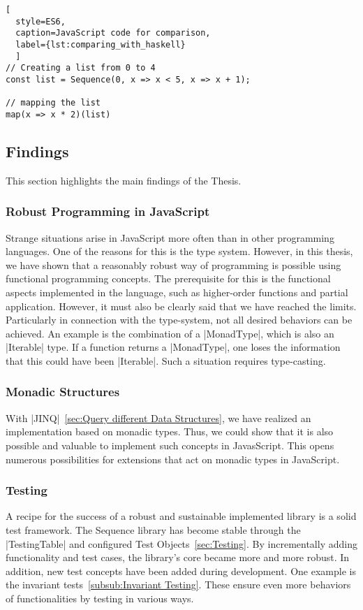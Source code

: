 \begin{lstlisting}[
  style=ES6, 
  caption=JavaScript code for comparison,
  label={lst:comparing_with_haskell}
  ]
// Creating a list from 0 to 4
const list = Sequence(0, x => x < 5, x => x + 1);

// mapping the list
map(x => x * 2)(list)
\end{lstlisting}

\subsection{Findings}
\label{sub:Findings}
This section highlights the main findings of the Thesis.

\subsubsection{Robust Programming in JavaScript}
\label{subsub:Robust Programming in JavaScript}
Strange situations arise in JavaScript more often than in other programming
languages. One of the reasons for this is the type system. However, in this
thesis, we have shown that a reasonably robust way of programming is possible
using functional programming concepts. The prerequisite for this is the
functional aspects implemented in the language, such as higher-order functions
and partial application. However, it must also be clearly said that we have
reached the limits. Particularly in connection with the type-system,
not all desired behaviors can be achieved.
An example is the combination of a |MonadType|, which is also an |Iterable|
type. If a function returns a |MonadType|, one loses the information that this
could have been |Iterable|. Such a situation requires type-casting.

\subsubsection{Monadic Structures}
\label{subsub:Monadic Structures}
With |JINQ|~\ref{sec:Query different Data Structures}, we have realized an
implementation based on monadic types. Thus, we could show that it is also
possible and valuable to implement such concepts in JavasScript.
This opens numerous possibilities for extensions that act on monadic types in
JavaScript.

\subsubsection{Testing}
\label{subsub:Testing}
A recipe for the success of a robust and sustainable implemented library is a
solid test framework. The Sequence library has become stable through the
|TestingTable| and configured Test Objects~\ref{sec:Testing}. By incrementally adding
functionality and test cases, the library's core became more and more robust.
In addition, new test concepts have been added during development. One example
is the invariant tests~\ref{subsub:Invariant Testing}. These ensure even more
behaviors of functionalities by testing in various ways.

